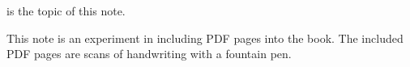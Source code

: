  is the topic of this note.

This note is an experiment in including PDF pages into the book. The included PDF pages are scans of handwriting with a fountain pen.
